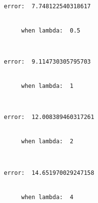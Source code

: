 \documentclass[11pt]{article}
\begin{document}
    \begin{Verbatim}[commandchars=\\\{\}]
     error:  7.748122540318617


     when lambda:  0.5

    \end{Verbatim}

    \begin{center}
    \end{center}
    { \hspace*{\fill} \\}
    
    \begin{Verbatim}[commandchars=\\\{\}]
     error:  9.114730305795703


     when lambda:  1

    \end{Verbatim}

    \begin{center}
    \end{center}
    { \hspace*{\fill} \\}
    
    \begin{Verbatim}[commandchars=\\\{\}]
     error:  12.008389460317261


     when lambda:  2

    \end{Verbatim}

    \begin{center}
    \end{center}
    { \hspace*{\fill} \\}
    
    \begin{Verbatim}[commandchars=\\\{\}]
     error:  14.651970029247158


     when lambda:  4

    \end{Verbatim}

    \begin{center}
    \end{center}
    { \hspace*{\fill} \\}
    
\end{document}

